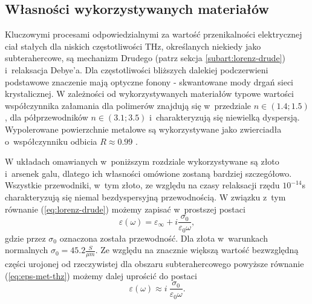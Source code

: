 \subsection{Własności wykorzystywanych materiałów}
\label{subart:thzmat}
Kluczowymi procesami odpowiedzialnymi za wartość przenikalności elektrycznej ciał stałych dla niskich częstotliwości THz, określanych niekiedy jako subterahercowe, są mechanizm Drudego (patrz sekcja \ref{subart:lorenz-drude}) i~relaksacja Debye'a. Dla częstotliwości bliższych dalekiej podczerwieni podstawowe znaczenie mają optyczne fonony - skwantowane mody drgań sieci krystalicznej. W zależności od wykorzystywanych materiałów typowe wartości współczynnika załamania dla polimerów znajdują się w~przedziale $n \in (1.4;1.5)$, dla półprzewodników $n\in (3.1;3.5)$ i~charakteryzują się niewielką dyspersją. Wypolerowane powierzchnie metalowe są wykorzystywane jako zwierciadła o~współczynniku odbicia $R\approx 0.99$ \cite{lee2009principles}.

W układach omawianych w~poniższym rozdziale wykorzystywane są złoto i~arsenek galu, dlatego ich własności omówione zostaną bardziej szczegółowo. Wszystkie przewodniki, w~tym złoto, ze względu na czasy relaksacji rzędu $10^{-14}$s charakteryzują się niemal bezdyspersyjną przewodnością. W związku z~tym równanie (\ref{eq:lorenz-drude}) możemy zapisać w~prostszej postaci
\begin{equation}
	\varepsilon(\omega)=\varepsilon_{\infty}+i \frac{\sigma_0}{\varepsilon_0 \omega},
	\label{eq:eps-met-thz}
\end{equation}
gdzie przez $\sigma_0$ oznaczona została przewodność. Dla złota w~warunkach normalnych $\sigma_0=45.2 \frac{S}{\mu m}$.   Ze względu na znacznie większą wartość bezwzględną części urojonej od rzeczywistej dla obszaru subterahercowego powyższe równanie (\ref{eq:eps-met-thz}) możemy dalej uprościć do postaci
\begin{equation}
	\varepsilon(\omega) \approx i~\frac{\sigma_0}{\varepsilon_0 \omega}.
	\label{eq:eps-met-thz-app}
\end{equation}

